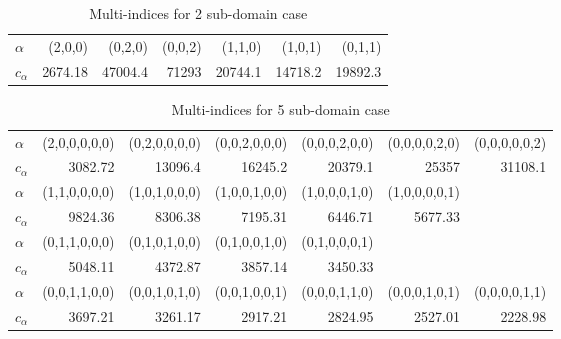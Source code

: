 \documentclass[final,1p,times]{elsarticle}
\begin{document}
\begin{table}\centering
\caption{Multi-indices for 2 sub-domain case}\label{t:multii2}
\begin{tabular}{l rrrrrr}
\hline
$\alpha$& (2,0,0) & (0,2,0) & (0,0,2) & (1,1,0) & (1,0,1) & (0,1,1) \\
$c_\alpha$&2674.18 & 47004.4 & 71293 & 20744.1 & 14718.2 & 19892.3\\
\hline
\end{tabular}
\end{table}
\begin{table}\centering
\caption{Multi-indices for 5 sub-domain case}\label{t:multii5}
\begin{tabular}{l rrrrrr}
\hline
$\alpha$& (2,0,0,0,0,0) & (0,2,0,0,0,0) & (0,0,2,0,0,0) & (0,0,0,2,0,0) & (0,0,0,0,2,0) & (0,0,0,0,0,2) \\
$c_\alpha$&3082.72 & 13096.4 & 16245.2 & 20379.1& 25357 & 31108.1\\
$\alpha$& (1,1,0,0,0,0) &(1,0,1,0,0,0) &(1,0,0,1,0,0) &(1,0,0,0,1,0) &(1,0,0,0,0,1)& \\
$c_\alpha$&9824.36  & 8306.38 & 7195.31 & 6446.71 & 5677.33& \\
$\alpha$& (0,1,1,0,0,0) &(0,1,0,1,0,0) &(0,1,0,0,1,0) &(0,1,0,0,0,1) && \\
$c_\alpha$&5048.11 & 4372.87& 3857.14 & 3450.33 & &  \\
$\alpha$& (0,0,1,1,0,0)& (0,0,1,0,1,0)&(0,0,1,0,0,1) &(0,0,0,1,1,0) &(0,0,0,1,0,1) &(0,0,0,0,1,1)  \\
$c_\alpha$&3697.21& 3261.17 & 2917.21& 2824.95 & 2527.01 & 2228.98 \\
\hline
\end{tabular}
\end{table}
\end{document}
